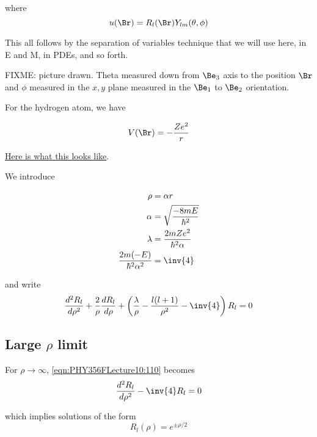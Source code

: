 where
\begin{equation}\label{eqn:PHY356FLecture10:80}
u(\Br) = R_l(\Br) Y_{lm}(\theta, \phi)
\end{equation}

This all follows by the separation of variables technique that we will use here, in E and M, in PDEs, and so forth.

FIXME: picture drawn.  Theta measured down from $\Be_3$ axis to the position $\Br$ and $\phi$ measured in the $x,y$ plane measured in the $\Be_1$ to $\Be_2$ orientation.

For the hydrogen atom, we have

\begin{equation}\label{eqn:PHY356FLecture10:90}
V(\Br) = - \frac{Z e^2}{r}
\end{equation}

\href{http://www.wolframalpha.com/input/?i=graph+-1/r}{Here is what this looks like}.

We introduce

\begin{align}\label{eqn:PHY356FLecture10:100}
\rho &= \alpha r \\
\alpha &= \sqrt{\frac{-8 m E}{\hbar^2}} \\
\lambda &= \frac{2 m Z e^2}{\hbar^2 \alpha} \\
\frac{2 m (- E) }{\hbar^2 \alpha^2 } &= \inv{4}
\end{align}

and write
\begin{equation}\label{eqn:PHY356FLecture10:110}
\frac{d^2 R_l}{d\rho^2} + \frac{2}{\rho} \frac{d R_l}{d\rho} + \left( \frac{\lambda}{\rho} - \frac{l(l+1)}{\rho^2} - \inv{4} \right) R_l = 0
\end{equation}

\subsection{Large \texorpdfstring{$\rho$}{rho} limit}

For $\rho \rightarrow \infty$, \ref{eqn:PHY356FLecture10:110} becomes
\begin{equation}\label{eqn:PHY356FLecture10:120}
\frac{d^2 R_l}{d\rho^2} - \inv{4} R_l = 0
\end{equation}

which implies solutions of the form
\begin{equation}\label{eqn:PHY356FLecture10:130}
R_l(\rho) = e^{\pm \rho/2}
\end{equation}

